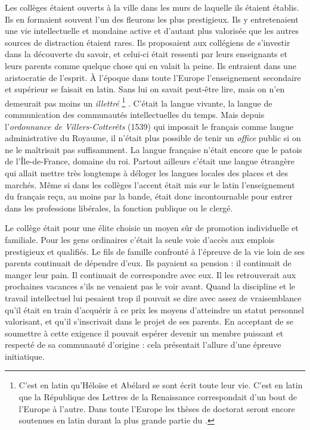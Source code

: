 Les collèges étaient ouverts à la ville dans les murs de laquelle ils étaient établis. Ils en formaient souvent l'un des fleurons les plus prestigieux. Ils y entretenaient une vie intellectuelle et mondaine active et d'autant plus valorisée que les autres sources de distraction étaient rares. Ils proposaient aux collégiens de s'investir dans la découverte du savoir, et celui-ci était ressenti par leurs enseignants et leurs parents comme quelque chose qui en valait la peine. Ils entraient dans une aristocratie de l'esprit. À l'époque dans toute l'Europe l'enseignement secondaire et supérieur se faisait en latin. Sans lui on savait peut-être lire, mais on n'en demeurait pas moins un \emph{illettré}%
\footnote{C'est en latin qu'Héloïse et Abélard se sont écrit toute leur vie. C'est en latin que la République des Lettres de la Renaissance correspondait d'un bout de l'Europe à l'autre. Dans toute l'Europe les thèses de doctorat seront encore soutenues en latin durant la plus grande partie du .}%
. C'était la langue vivante, la langue de communication des communautés intellectuelles du temps. Mais depuis l'\emph{ordonnance de Villers-Cotterêts} (1539) qui imposait le français comme langue administrative du Royaume, il n'était plus possible de tenir un \emph{office} public si on ne le maîtrisait pas suffisamment. La langue française n'était encore que le patois de l'Île-de-France, domaine du roi. Partout ailleurs c'était une langue étrangère qui allait mettre très longtemps à déloger les langues locales des places et des marchés. Même si dans les collèges l'accent était mis sur le latin l'enseignement du français reçu, au moins par la bande, était donc incontournable pour entrer dans les professions libérales, la fonction publique ou le clergé. 


 Le collège était pour une élite choisie un moyen sûr de promotion individuelle et familiale. Pour les gens ordinaires c'était la seule voie d'accès aux emplois prestigieux et qualifiés. Le fils de famille confronté à l'épreuve de la vie loin de ses parents continuait de dépendre d'eux. Ils payaient sa pension : il continuait de manger leur pain. Il continuait de correspondre avec eux. Il les retrouverait aux prochaines vacances s'ils ne venaient pas le voir avant. Quand la discipline et le travail intellectuel lui pesaient trop il pouvait se dire avec assez de vraisemblance qu'il était en train d'acquérir à ce prix les moyens d'atteindre un statut personnel valorisant, et qu'il s'inscrivait dans le projet de ses parents. En acceptant de se soumettre à cette exigence il pouvait espérer devenir un membre puissant et respecté de sa communauté d'origine : cela présentait l'allure d'une épreuve initiatique.
 
